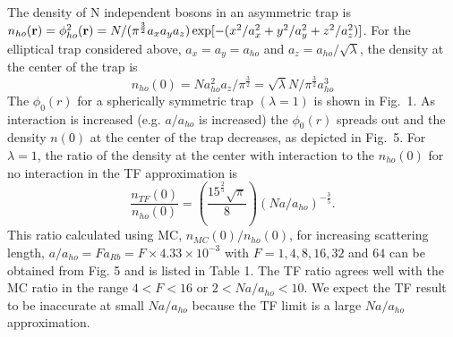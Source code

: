 \documentclass[aps,pra,twocolumn,groupedaddress]{revtex4}
\begin{document}
The density of N independent bosons in an
asymmetric trap is 
$n_{ho}({\bf r}) = \phi_{ho}^2({\bf r}) = N/(\pi^{\frac{3}{2}}a_x a_y a_z) 
\exp[-(x^2/a_x^2+y^2/a_y^2+z^2/a_z^2)]$.  For the elliptical trap 
considered above,
$a_x=a_y=a_{ho}$ and $a_z = a_{ho}/ \sqrt{\lambda}$, the
density at the center of the trap is \cite{dalfovo99}
\begin{equation}
n_{ho}(0) = Na_{ho}^2a_z /\pi^{\frac{3}{2}} =
\sqrt{\lambda} N/ \pi^{\frac{3}{2}}a_{ho}^3
\label{d1}
\end{equation}
The $\phi_0(r)$ for a spherically
symmetric trap $(\lambda = 1)$ is shown in Fig.~1. As interaction is increased
(e.g. $a/a_{ho}$ is increased) the $\phi_0(r)$ spreads out and the density $n(0)$ at the
center of the trap decreases, as depicted in Fig.~5.  For $\lambda=1$, the
ratio of the density at the center with interaction to the $n_{ho}(0)$ for no
interaction in the TF approximation is
\begin{equation}
\frac{n_{TF}(0)}{n_{ho}(0)} = (\frac{15^{\frac{2}{5}}\sqrt{\pi}}{8})
(N a/a_{ho})^{-\frac{3}{5}} \label{density_ratio}.
\label{d2}
\end{equation}
This ratio calculated using MC, $n_{MC}(0)/n_{ho}(0)$, for increasing 
scattering length, $a/a_{ho} = F a_{Rb} = F \times 4.33 \times 10^{-3}$ with 
$F = 1,4,8,16,32 $ and $64$ can be obtained from  
Fig. 5 and is listed in Table 1.  The TF ratio agrees well with the MC
ratio in the range $4<F<16$ or $2 < N a/a_{ho} < 10$. 
We expect the TF result to be 
inaccurate at small $Na/a_{ho}$ because the TF limit is a large $Na/a_{ho}$ 
approximation. 
\end{document}
